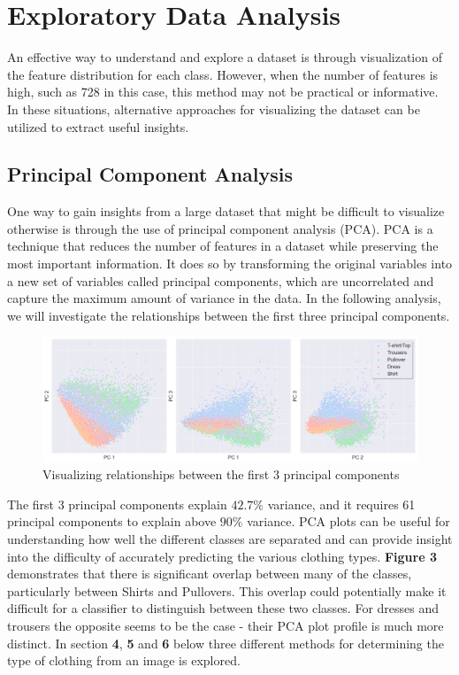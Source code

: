 \section{Exploratory Data Analysis}

An effective way to understand and explore a dataset is through visualization of the feature distribution for each class.
However, when the number of features is high, such as 728 in this case, this method may not be practical or informative.
In these situations, alternative approaches for visualizing the dataset can be utilized to extract useful insights.

\subsection{Principal Component Analysis}
One way to gain insights from a large dataset that might be difficult to visualize otherwise is through the use of principal component analysis (PCA).
PCA is a technique that reduces the number of features in a dataset while preserving the most important information.
It does so by transforming the original variables into a new set of variables called principal components, which are uncorrelated and capture the maximum amount of variance in the data.
In the following analysis, we will investigate the relationships between the first three principal components.

\begin{figure}[H]
    \includegraphics[scale=0.30]{figures_for_report/PCA}
    \captionsetup{justification=centering,margin=2cm}
    \caption{Visualizing relationships between the first 3 principal components}
\end{figure}

The first 3 principal components explain $42.7\%$ variance, and it requires 61 principal components to explain above $90\%$ variance.
PCA plots can be useful for understanding how well the different classes are separated and can provide insight into the difficulty of accurately predicting the various clothing types.
\textbf{Figure 3} demonstrates that there is significant overlap between many of the classes, particularly between Shirts and Pullovers.
This overlap could potentially make it difficult for a classifier to distinguish between these two classes.
For dresses and trousers the opposite seems to be the case - their PCA plot profile is much more distinct.
In section \textbf{4}, \textbf{5} and \textbf{6} below three different methods for determining the type of clothing from an
image is explored.
